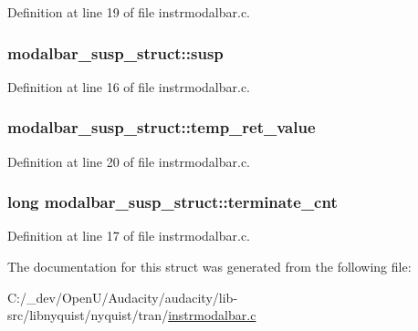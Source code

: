 Definition at line 19 of file instrmodalbar.\+c.

\subsubsection[{\texorpdfstring{susp}{susp}}]{ modalbar\+\_\+susp\+\_\+struct\+::susp}\hypertarget{structmodalbar__susp__struct_a0e54bcf6273e7e35b64d6ada49dbf9a7}{}\label{structmodalbar__susp__struct_a0e54bcf6273e7e35b64d6ada49dbf9a7}


Definition at line 16 of file instrmodalbar.\+c.

\subsubsection[{\texorpdfstring{temp\+\_\+ret\+\_\+value}{temp_ret_value}}]{ modalbar\+\_\+susp\+\_\+struct\+::temp\+\_\+ret\+\_\+value}\hypertarget{structmodalbar__susp__struct_a756eb6dccabdf349ba135841a540d237}{}\label{structmodalbar__susp__struct_a756eb6dccabdf349ba135841a540d237}


Definition at line 20 of file instrmodalbar.\+c.

\subsubsection[{\texorpdfstring{terminate\+\_\+cnt}{terminate_cnt}}]{\setlength{\rightskip}{0pt plus 5cm}long modalbar\+\_\+susp\+\_\+struct\+::terminate\+\_\+cnt}\hypertarget{structmodalbar__susp__struct_a71ec387a93570291d4ef40818f2bd73f}{}\label{structmodalbar__susp__struct_a71ec387a93570291d4ef40818f2bd73f}


Definition at line 17 of file instrmodalbar.\+c.



The documentation for this struct was generated from the following file\+:\begin{DoxyCompactItemize}
\item 
C\+:/\+\_\+dev/\+Open\+U/\+Audacity/audacity/lib-\/src/libnyquist/nyquist/tran/\hyperlink{instrmodalbar_8c}{instrmodalbar.\+c}\end{DoxyCompactItemize}
